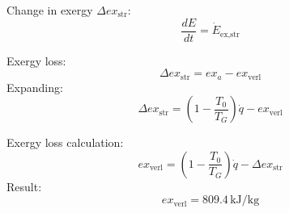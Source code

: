 Change in exergy \( \Delta ex_{\text{str}} \):  
\[ 
\frac{dE}{dt} = \dot{E}_{\text{ex,str}} 
\]  

Exergy loss:  
\[ 
\Delta ex_{\text{str}} = ex_{a} - ex_{\text{verl}} 
\]  
Expanding:  
\[ 
\Delta ex_{\text{str}} = (1 - \frac{T_0}{T_G}) \dot{q} - ex_{\text{verl}} 
\]  

Exergy loss calculation:  
\[ 
ex_{\text{verl}} = (1 - \frac{T_0}{T_G}) \dot{q} - \Delta ex_{\text{str}} 
\]  
Result:  
\[ 
ex_{\text{verl}} = 809.4 \, \text{kJ/kg} 
\]